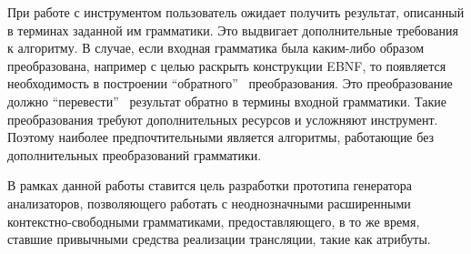 При работе с инструментом пользователь ожидает получить результат, описанный в терминах заданной им грамматики. Это выдвигает дополнительные требования к алгоритму. В случае, если входная грамматика была каким-либо образом преобразована, например с целью раскрыть конструкции EBNF, то появляется необходимость в построении "`обратного"' \ преобразования. Это преобразование должно "`перевести"' \ результат обратно в термины входной грамматики. Такие преобразования  требуют дополнительных ресурсов и усложняют инструмент. Поэтому наиболее предпочтительными является алгоритмы, работающие без дополнительных преобразований грамматики.

В рамках данной работы ставится цель разработки прототипа генератора анализаторов, позволяющего работать с неоднозначными расширенными контекстно-свободными грамматиками, предоставляющего, в то же время, ставшие привычными средства реализации трансляции, такие как атрибуты.
